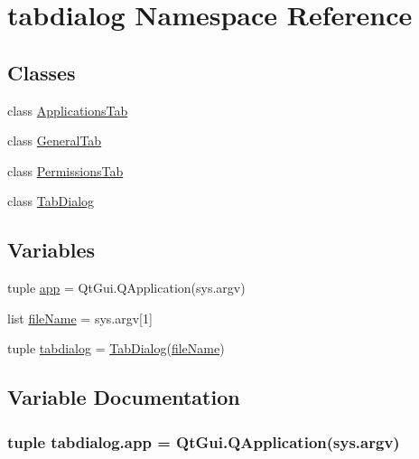 \hypertarget{namespacetabdialog}{}\section{tabdialog Namespace Reference}
\label{namespacetabdialog}
\subsection*{Classes}
\begin{DoxyCompactItemize}
\item 
class \hyperlink{classtabdialog_1_1ApplicationsTab}{Applications\+Tab}
\item 
class \hyperlink{classtabdialog_1_1GeneralTab}{General\+Tab}
\item 
class \hyperlink{classtabdialog_1_1PermissionsTab}{Permissions\+Tab}
\item 
class \hyperlink{classtabdialog_1_1TabDialog}{Tab\+Dialog}
\end{DoxyCompactItemize}
\subsection*{Variables}
\begin{DoxyCompactItemize}
\item 
tuple \hyperlink{namespacetabdialog_aa55dbebf47c72465fc9a7c6806f612fe}{app} = Qt\+Gui.\+Q\+Application(sys.\+argv)
\item 
list \hyperlink{namespacetabdialog_ad3724c3a0fb87aea18a10ae5c6832585}{file\+Name} = sys.\+argv\mbox{[}1\mbox{]}
\item 
tuple \hyperlink{namespacetabdialog_a39837390b8f6b77d1aeabf2eb04ca680}{tabdialog} = \hyperlink{classtabdialog_1_1TabDialog}{Tab\+Dialog}(\hyperlink{namespacetabdialog_ad3724c3a0fb87aea18a10ae5c6832585}{file\+Name})
\end{DoxyCompactItemize}


\subsection{Variable Documentation}
\hypertarget{namespacetabdialog_aa55dbebf47c72465fc9a7c6806f612fe}{}
\subsubsection[{app}]{\setlength{\rightskip}{0pt plus 5cm}tuple tabdialog.\+app = Qt\+Gui.\+Q\+Application(sys.\+argv)}\label{namespacetabdialog_aa55dbebf47c72465fc9a7c6806f612fe}
\hypertarget{namespacetabdialog_ad3724c3a0fb87aea18a10ae5c6832585}{}
